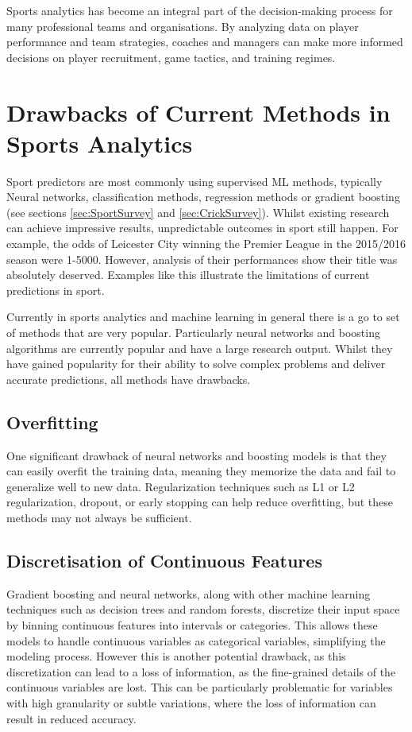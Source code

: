 \documentclass[12pt,a4paper]{report}
\theoremstyle{definition}
\begin{document}
Sports analytics has become an integral part of the decision-making process for many professional teams and organisations. 
By analyzing data on player performance and team strategies, coaches and managers can make more informed decisions on player recruitment, game tactics, and training regimes.


\section{Drawbacks of Current Methods in Sports Analytics}
 
Sport predictors are most commonly using supervised ML methods, typically Neural networks, classification methods, regression methods or gradient boosting \citep{horvat2020} (see sections \ref{sec:SportSurvey} and \ref{sec:CrickSurvey}).
Whilst existing research can achieve impressive results, unpredictable outcomes in sport still happen. For example, the odds of Leicester City winning the Premier League in the 2015/2016 season were 1-5000. 
However, analysis of their performances show their title was absolutely deserved.
Examples like this illustrate the limitations of current predictions in sport.

Currently in sports analytics and machine learning in general there is a go to set of methods that are very popular.
Particularly neural networks and boosting algorithms are currently popular and have a large research output.
Whilst they have gained popularity for their ability to solve complex problems and deliver accurate predictions, all methods have drawbacks.

\subsection{Overfitting}

One significant drawback of neural networks and boosting models is that they can easily overfit the training data, meaning they memorize the data and fail to generalize well to new data. 
Regularization techniques such as L1 or L2 regularization, dropout, or early stopping can help reduce overfitting, but these methods may not always be sufficient.

\subsection{Discretisation of Continuous Features}

Gradient boosting and neural networks, along with other machine learning techniques such as decision trees and random forests, discretize their input space by binning continuous features into intervals or categories. 
This allows these models to handle continuous variables as categorical variables, simplifying the modeling process. 
However this is another potential drawback, as this discretization can lead to a loss of information, as the fine-grained details of the continuous variables are lost. 
This can be particularly problematic for variables with high granularity or subtle variations, where the loss of information can result in reduced accuracy.
\end{document}
